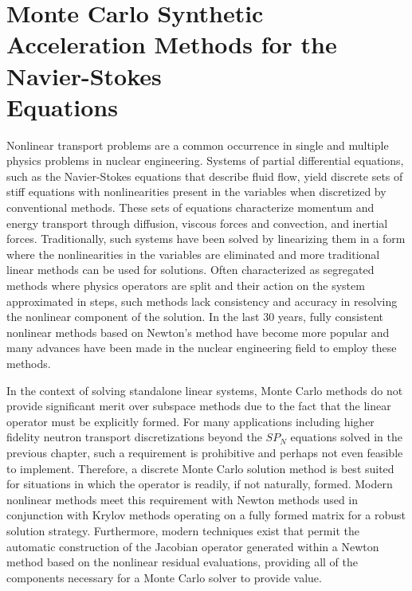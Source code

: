 \chapter{Monte Carlo Synthetic Acceleration Methods for the
  Navier-Stokes \\Equations\ }
\label{ch:nonlinear_problem}
Nonlinear transport problems are a common occurrence in single and
multiple physics problems in nuclear engineering. Systems of partial
differential equations, such as the Navier-Stokes equations that
describe fluid flow, yield discrete sets of stiff equations with
nonlinearities present in the variables when discretized by
conventional methods. These sets of equations characterize momentum
and energy transport through diffusion, viscous forces and convection,
and inertial forces. Traditionally, such systems have been solved by
linearizing them in a form where the nonlinearities in the variables
are eliminated and more traditional linear methods can be used for
solutions. Often characterized as segregated methods where physics
operators are split and their action on the system approximated in
steps, such methods lack consistency and accuracy in resolving the
nonlinear component of the solution. In the last 30 years, fully
consistent nonlinear methods based on Newton's method have become more
popular and many advances have been made in the nuclear engineering
field to employ these methods.

In the context of solving standalone linear systems, Monte Carlo
methods do not provide significant merit over subspace methods due to
the fact that the linear operator must be explicitly formed. For many
applications including higher fidelity neutron transport
discretizations beyond the $SP_N$ equations solved in the previous
chapter, such a requirement is prohibitive and perhaps not even
feasible to implement. Therefore, a discrete Monte Carlo solution
method is best suited for situations in which the operator is readily,
if not naturally, formed. Modern nonlinear methods meet this
requirement with Newton methods used in conjunction with Krylov
methods operating on a fully formed matrix for a robust solution
strategy. Furthermore, modern techniques exist that permit the
automatic construction of the Jacobian operator generated within a
Newton method based on the nonlinear residual evaluations, providing
all of the components necessary for a Monte Carlo solver to provide
value.

